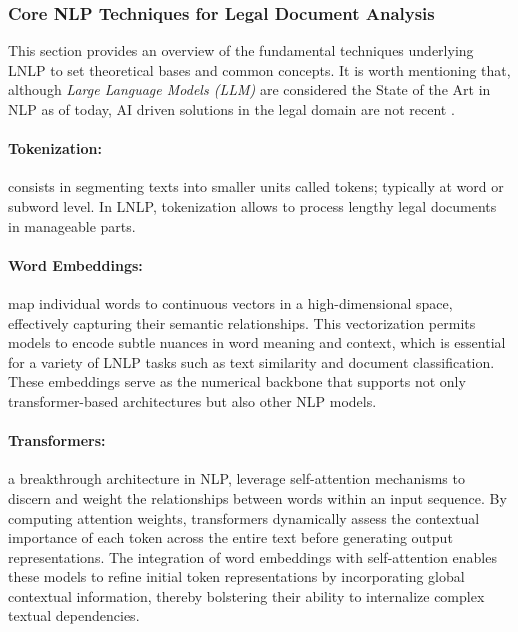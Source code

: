 \documentclass[onecolumn, journal, english, 12pt, a4paper]{IEEEtran} %
\theoremstyle{definition}
\begin{document}
\subsubsection{Core NLP Techniques for Legal Document Analysis}
\label{sec:nlp-techniques}

This section provides an overview of the fundamental techniques
underlying LNLP to set theoretical bases and common concepts. It is
worth mentioning that, although \textit{Large Language Models (LLM)}
are considered the State of the Art in NLP as of today, AI driven
solutions in the legal domain are not recent \cite{Martinez2024}.


\paragraph{Tokenization:} consists in segmenting texts into smaller
units called tokens; typically at word or subword level. In LNLP,
tokenization allows to process lengthy legal documents in manageable
parts.

\paragraph{Word Embeddings:}
map individual words to continuous vectors in a high-dimensional
space, effectively capturing their semantic relationships. This
vectorization permits models to encode subtle nuances in word meaning
and context, which is essential for a variety of LNLP tasks such as
text similarity and document classification. These embeddings serve as
the numerical backbone that supports not only transformer-based
architectures but also other NLP models.

\paragraph{Transformers:} a breakthrough architecture in NLP, leverage
self-attention mechanisms to discern and weight the relationships
between words within an input sequence. By computing attention
weights, transformers dynamically assess the contextual importance of
each token across the entire text before generating output
representations. The integration of word embeddings with
self-attention enables these models to refine initial token
representations by incorporating global contextual information,
thereby bolstering their ability to internalize complex textual
dependencies.
\end{document}
